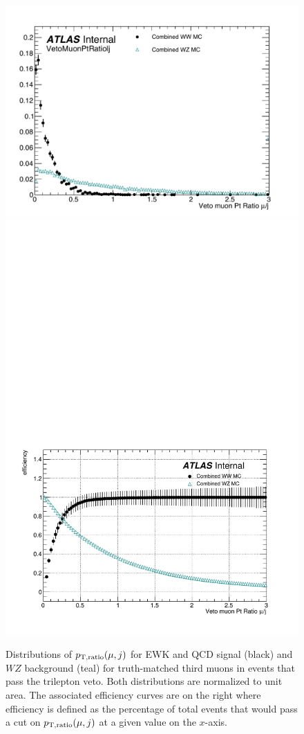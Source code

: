 \begin{figure}[htbp]
  \centering
  \includegraphics[width=.48\textwidth]{figs/ssww_13tev/custom_or/VetoMuonPtRatiolj}
  \includegraphics[width=.48\textwidth]{figs/ssww_13tev/custom_or/ROC_VetoMuonPtRatiolj}
  \caption{Distributions of $p_{\textrm{T},\textrm{ratio}}(\mu,j)$ for EWK and QCD \ssww signal (black) and $WZ$ background (teal) for truth-matched third muons in events that pass the trilepton veto.  Both distributions are normalized to unit area.  The associated efficiency curves are on the right where efficiency is defined as the percentage of total events that would pass a cut on $p_{\textrm{T},\textrm{ratio}}(\mu,j)$ at a given value on the $x$-axis.}
  \label{fig:ssww13tev_ptratio_muon}
\end{figure}

